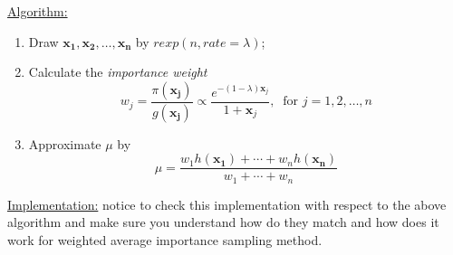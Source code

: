 \documentclass[12pt]{article}
\newcommand{\varx}{\mathbf{x}}
\numberwithin{equation}{subsection}
\begin{document}
\underline{Algorithm:}
\begin{enumerate}[(1)]
\item Draw $\mathbf{x_1}, \mathbf{x_2}, \dots, \mathbf{x_n}$ by $rexp(n, rate=\lambda)$;
\item Calculate the \textit{importance weight} $$w_j = \frac{\pi(\mathbf{x_j})}{g(\mathbf{x_j})} \propto \frac{e^{-(1-\lambda)\varx_j}}{1+\varx_j},~\text{ for } j = 1, 2, \dots, n$$
\item Approximate $\mu$ by 
$$\hat{\mu} = \frac{w_1h(\mathbf{x_1}) + \cdots + w_nh(\mathbf{x_n})}{w_1 + \cdots + w_n} $$
\end{enumerate}
\hfill \break

\noindent
\underline{Implementation:} notice to check this implementation with respect to the above algorithm and make sure you understand how do they match and how does it work for weighted average importance sampling method.
\end{document}
